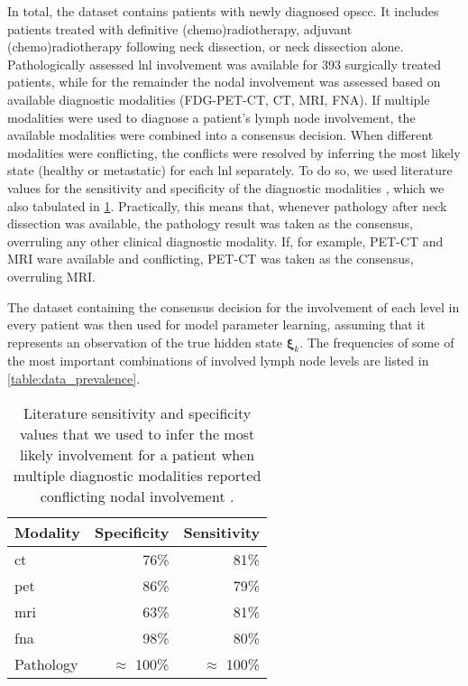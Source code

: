 \documentclass[twocolumn]{aastex631}
\begin{document}
In total, the dataset contains  patients with newly diagnosed \gls{opscc}. It includes patients treated with definitive (chemo)radiotherapy, adjuvant (chemo)radiotherapy following neck dissection, or neck dissection alone. Pathologically assessed \gls{lnl} involvement was available for 393 surgically treated patients, while for the remainder the nodal involvement was assessed based on available diagnostic modalities (FDG-PET-CT, CT, MRI, FNA). If multiple modalities were used to diagnose a patient's lymph node involvement, the available modalities were combined into a consensus decision. When different modalities were conflicting, the conflicts were resolved by inferring the most likely state (healthy or metastatic) for each \gls{lnl} separately. To do so, we used literature values for the sensitivity and specificity of the diagnostic modalities \cite{de_bondt_detection_2007,kyzas_18f-fluorodeoxyglucose_2008}, which we also tabulated in \cref{table:sens_spec}. Practically, this means that, whenever pathology after neck dissection was available, the pathology result was taken as the consensus, overruling any other clinical diagnostic modality. If, for example, PET-CT and MRI ware available and conflicting, PET-CT was taken as the consensus, overruling MRI.

The dataset containing the consensus decision for the involvement of each level in every patient was then used for model parameter learning, assuming that it represents an observation of the true hidden state $\boldsymbol{\xi}_k$. The frequencies of some of the most important combinations of involved lymph node levels are listed in \cref{table:data_prevalence}.


\begin{table}
\centering
    \begin{tabular}{|l|rr|}
        \hline
        \textbf{Modality} & \textbf{Specificity} & \textbf{Sensitivity} \\
        \hline
        \acrshort{ct} & 76\% & 81\% \\
        \acrshort{pet} & 86\% & 79\% \\
        \gls{mri} & 63\% & 81\% \\
        \acrshort{fna} & 98\% & 80\% \\
        Pathology & $\approx$ 100\% & $\approx$ 100\% \\
        \hline
    \end{tabular}
    \caption{Literature sensitivity and specificity values that we used to infer the most likely involvement for a patient when multiple diagnostic modalities reported conflicting nodal involvement \cite{de_bondt_detection_2007,kyzas_18f-fluorodeoxyglucose_2008}.}
    \label{table:sens_spec}
\end{table}
\end{document}
